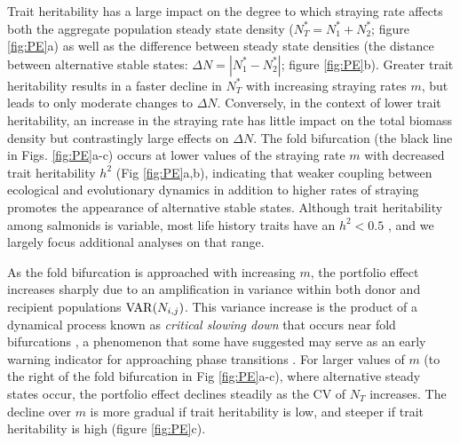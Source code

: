 \documentclass[twocolumn,preprintnumbers,amsmath,amssymb,superscriptaddress]{revtex4}
\begin{document}
Trait heritability has a large impact on the degree to which straying rate affects both the aggregate population steady state density ($N^*_T=N^*_1+N^*_2$; figure \ref{fig:PE}a) as well as the difference between steady state densities (the distance between alternative stable states: $\Delta N=|N^*_1-N^*_2|$; figure \ref{fig:PE}b).
Greater trait heritability results in a faster decline in $N_T^*$ with increasing straying rates $m$, but leads to only moderate changes to $\Delta N$.
Conversely, in the context of lower trait heritability, an increase in the straying rate has little impact on the total biomass density but contrastingly large effects on $\Delta N$.
The fold bifurcation (the black line in Figs. \ref{fig:PE}a-c) occurs at lower values of the straying rate $m$ with decreased trait heritability $h^2$ (Fig \ref{fig:PE}a,b), indicating that weaker coupling between ecological and evolutionary dynamics in addition to higher rates of straying promotes the appearance of alternative stable states.
Although trait heritability among salmonids is variable, most life history traits have an $h^2 <0.5$ \cite{Carlson:2008hl}, and we largely focus additional analyses on that range.

As the fold bifurcation is approached with increasing $m$, the portfolio effect increases sharply due to an amplification in variance within both donor and recipient populations ${\rm VAR}(N_{i,j})$.
This variance increase is the product of a dynamical process known as \emph{critical slowing down} that occurs near fold bifurcations \cite{Scheffer:2009gg}, a phenomenon that some have suggested may serve as an early warning indicator for approaching phase transitions \cite{Scheffer:2009gg,Lade:2012eu,Anonymous:2013br,Dakos:2014br}.
For larger values of $m$ (to the right of the fold bifurcation in Fig \ref{fig:PE}a-c), where alternative steady states occur, the portfolio effect declines steadily as the CV of $N_T$ increases.
The decline over $m$ is more gradual if trait heritability is low, and steeper if trait heritability is high (figure \ref{fig:PE}c).
\end{document}
